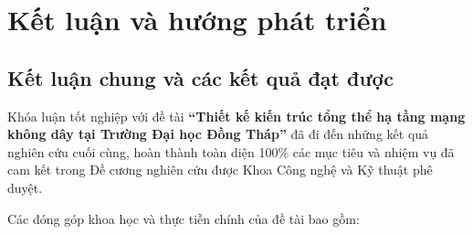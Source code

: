 \chapter{Kết luận và hướng phát triển}
\label{chap:ket-luan}

\section{Kết luận chung và các kết quả đạt được}

Khóa luận tốt nghiệp với đề tài \textbf{“Thiết kế kiến trúc tổng thể hạ tầng mạng không dây tại Trường Đại học Đồng Tháp”} đã đi đến những kết quả nghiên cứu cuối cùng, hoàn thành toàn diện 100\% các mục tiêu và nhiệm vụ đã cam kết trong Đề cương nghiên cứu được Khoa Công nghệ và Kỹ thuật phê duyệt.

Các đóng góp khoa học và thực tiễn chính của đề tài bao gồm:
